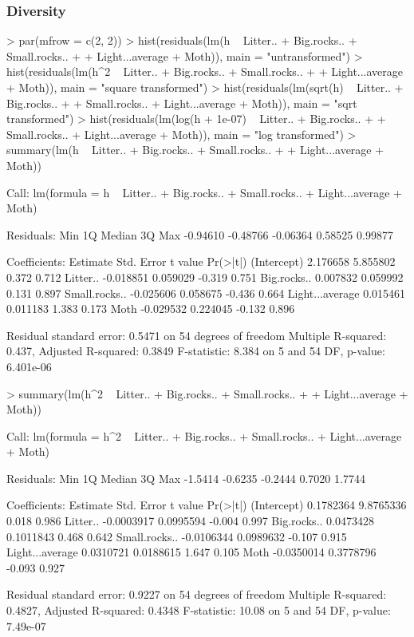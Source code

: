 \documentclass[a4paper]{article}
\begin{document}
\subsubsection{Diversity}
\begin{Schunk}
\begin{Sinput}
> par(mfrow = c(2, 2))
> hist(residuals(lm(h ~ Litter.. + Big.rocks.. + Small.rocks.. + 
+     Light...average + Moth)), main = "untransformed")
> hist(residuals(lm(h^2 ~ Litter.. + Big.rocks.. + Small.rocks.. + 
+     Light...average + Moth)), main = "square transformed")
> hist(residuals(lm(sqrt(h) ~ Litter.. + Big.rocks.. + 
+     Small.rocks.. + Light...average + Moth)), main = "sqrt transformed")
> hist(residuals(lm(log(h + 1e-07) ~ Litter.. + Big.rocks.. + 
+     Small.rocks.. + Light...average + Moth)), main = "log transformed")
> summary(lm(h ~ Litter.. + Big.rocks.. + Small.rocks.. + 
+     Light...average + Moth))
\end{Sinput}
\begin{Soutput}
Call:
lm(formula = h ~ Litter.. + Big.rocks.. + Small.rocks.. + Light...average + 
    Moth)

Residuals:
     Min       1Q   Median       3Q      Max 
-0.94610 -0.48766 -0.06364  0.58525  0.99877 

Coefficients:
                 Estimate Std. Error t value Pr(>|t|)
(Intercept)      2.176658   5.855802   0.372    0.712
Litter..        -0.018851   0.059029  -0.319    0.751
Big.rocks..      0.007832   0.059992   0.131    0.897
Small.rocks..   -0.025606   0.058675  -0.436    0.664
Light...average  0.015461   0.011183   1.383    0.173
Moth            -0.029532   0.224045  -0.132    0.896

Residual standard error: 0.5471 on 54 degrees of freedom
Multiple R-squared: 0.437,	Adjusted R-squared: 0.3849 
F-statistic: 8.384 on 5 and 54 DF,  p-value: 6.401e-06 
\end{Soutput}
\begin{Sinput}
> summary(lm(h^2 ~ Litter.. + Big.rocks.. + Small.rocks.. + 
+     Light...average + Moth))
\end{Sinput}
\begin{Soutput}
Call:
lm(formula = h^2 ~ Litter.. + Big.rocks.. + Small.rocks.. + Light...average + 
    Moth)

Residuals:
    Min      1Q  Median      3Q     Max 
-1.5414 -0.6235 -0.2444  0.7020  1.7744 

Coefficients:
                  Estimate Std. Error t value Pr(>|t|)
(Intercept)      0.1782364  9.8765336   0.018    0.986
Litter..        -0.0003917  0.0995594  -0.004    0.997
Big.rocks..      0.0473428  0.1011843   0.468    0.642
Small.rocks..   -0.0106344  0.0989632  -0.107    0.915
Light...average  0.0310721  0.0188615   1.647    0.105
Moth            -0.0350014  0.3778796  -0.093    0.927

Residual standard error: 0.9227 on 54 degrees of freedom
Multiple R-squared: 0.4827,	Adjusted R-squared: 0.4348 
F-statistic: 10.08 on 5 and 54 DF,  p-value: 7.49e-07 
\end{Soutput}
\end{Schunk}
\end{document}
